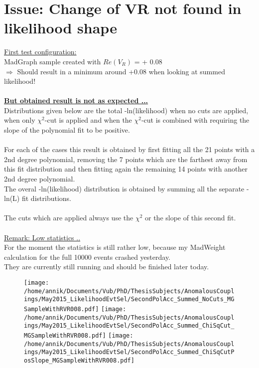 \section{Issue: Change of VR not found in likelihood shape}

\underline{First test configuration:} \\
MadGraph sample created with $Re(V_{R})$ = + 0.08 \\
$\Rightarrow$ Should result in a minimum around +0.08 when looking at summed likelihood!
\\
\\
\textbf{\underline{But obtained result is not as expected ...}}\\
Distributions given below are the total -ln(likelihood) when no cuts are applied, when only $\chi^{2}$-cut is applied and when the $\chi^{2}$-cut is combined with requiring the slope of the polynomial fit to be positive.\\
\\
For each of the cases this result is obtained by first fitting all the 21 points with a 2nd degree polynomial, removing the 7 points which are the farthest away from this fit distribution and then fitting again the remaining 14 points with another 2nd degree polynomial.\\
The overal -ln(likelihood) distribution is obtained by summing all the separate -ln(L) fit distributions.\\
\\
The cuts which are applied always use the $\chi^{2}$ or the slope of this second fit.\\
\\
\underline{Remark: Low statistics ..}\\
For the moment the statistics is still rather low, because my MadWeight calculation for the full 10000 events crashed yesterday.\\
They are currently still running and should be finished later today.
\newpage

\begin{figure}[h!t]
 \centering
 \texttt{[image: /home/annik/Documents/Vub/PhD/ThesisSubjects/AnomalousCouplings/May2015\_LikelihoodEvtSel/SecondPolAcc\_Summed\_NoCuts\_MGSampleWithRVR008.pdf]}
 \texttt{[image: /home/annik/Documents/Vub/PhD/ThesisSubjects/AnomalousCouplings/May2015\_LikelihoodEvtSel/SecondPolAcc\_Summed\_ChiSqCut\_MGSampleWithRVR008.pdf]}
 \texttt{[image: /home/annik/Documents/Vub/PhD/ThesisSubjects/AnomalousCouplings/May2015\_LikelihoodEvtSel/SecondPolAcc\_Summed\_ChiSqCutPosSlope\_MGSampleWithRVR008.pdf]}
\end{figure}

